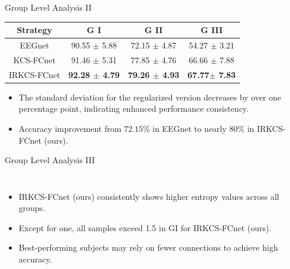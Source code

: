 \documentclass[aspectratio=169]{beamer}
\begin{document}
\begin{frame}{Group Level Analysis II}
    \begin{table}
        \centering
        \begin{tabular}{|c|c|c|c|}
            \hline
            Strategy & G I & G II  & G III \\
            \hline
            EEGnet & 90.55 $\pm$ 5.88 & 72.15 $\pm$ 4.87 & 54.27 $\pm$ 3.21 \\
            KCS-FCnet & 91.46 $\pm$ 5.31   &  77.85 $\pm$ 4.76 & 66.66 $\pm$ 7.88 \\
            IRKCS-FCnet & \textbf{92.28 $\pm$ 4.79}  & \textbf{79.26 $\pm$ 4.93}  & \textbf{67.77$\pm$ 7.83} \\
            \hline
        \end{tabular}
    \end{table}
    \begin{itemize}
        \item The standard deviation for the regularized version decreases by over one percentage point, indicating enhanced performance consistency.
        \item Accuracy improvement from $72.15\%$ in EEGnet to nearly $80\%$ in IRKCS-FCnet (ours).
    \end{itemize}
\end{frame}

\begin{frame}{Group Level Analysis III}
    \begin{columns}
        \begin{itemize}
            \item IRKCS-FCnet (ours) consistently shows higher entropy values across all groups.
            \item Except for one, all samples exceed 1.5 in GI for IRKCS-FCnet (ours).
            \item Best-performing subjects may rely on fewer connections to achieve high accuracy.
        \end{itemize}
            \centering
            \resizebox{1\linewidth}{!}{}
    \end{columns}  
\end{frame}
\end{document}
